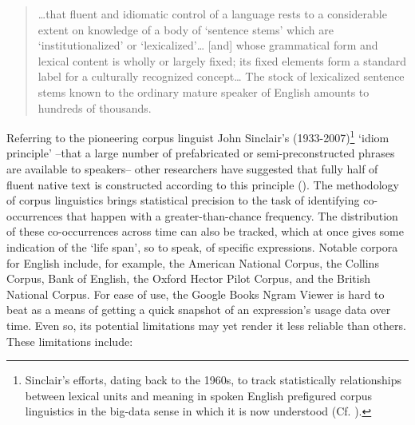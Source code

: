 \documentclass[output=paper]{langsci/langscibook}
\begin{document}
\begin{quote}
…that fluent and idiomatic control of a language rests to a considerable extent on knowledge of a body of ‘sentence stems’ which are ‘institutionalized’ or ‘lexicalized’… [and] whose grammatical form and lexical content is wholly or largely fixed; its fixed elements form a standard label for a culturally recognized concept… The stock of lexicalized sentence stems known to the ordinary mature speaker of English amounts to hundreds of thousands.  
\end{quote}

Referring to the pioneering corpus linguist John Sinclair’s (1933-2007)\footnote{ \textrm{Sinclair’s efforts, dating back to the 1960s, to track statistically relationships between lexical units and meaning in spoken English prefigured corpus linguistics in the big-data sense in which it is now understood (Cf. \citealt{chapelle_encyclopedia_2013-1}).}} ‘idiom principle’ –that a large number of prefabricated or semi-preconstructed phrases are available to speakers– other researchers have suggested that fully half of fluent native text is constructed according to this principle (\citealt[29]{erman_idiom_2000}). The methodology of corpus linguistics brings statistical precision to the task of identifying co-occurrences that happen with a greater-than-chance frequency.  The distribution of these co-occurrences across time can also be tracked, which at once gives some indication of the ‘life span’, so to speak, of specific expressions. Notable corpora for English include, for example, the American National Corpus, the Collins Corpus, Bank of English, the Oxford Hector Pilot Corpus, and the British National Corpus. For ease of use, the Google Books Ngram Viewer is hard to beat as a means of getting a quick snapshot of an expression’s usage data over time.  Even so, its potential limitations may yet render it less reliable than others. These limitations include: 
\end{document}
